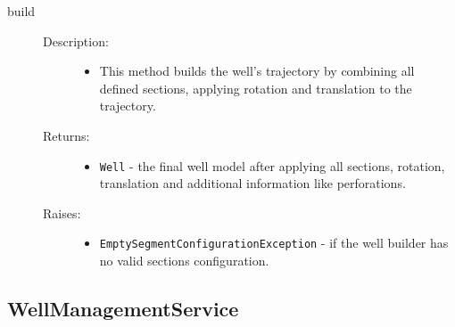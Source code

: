 \documentclass[english,10pt,a4paper]{article}
\begin{document}
\begin{description}
		\item[ \colorbox{gray!20}{build}] \hfill
		\begin{description}
			\item[Description:] \hfill
			\begin{itemize}
				\item This method builds the well's trajectory by combining all defined sections, applying rotation and translation to the trajectory.
			\end{itemize}

			\item[Returns:] \hfill
			\begin{itemize}
				\item \texttt{Well} - the final well model after applying all sections, rotation, translation and additional information like perforations.
			\end{itemize}

			\item[Raises:] \hfill
			\begin{itemize}
				\item \texttt{EmptySegmentConfigurationException} - if the well builder has no valid sections configuration.
			\end{itemize}
		\end{description}

	\end{description}
	\newpage
\subsection{WellManagementService}
\end{document}
